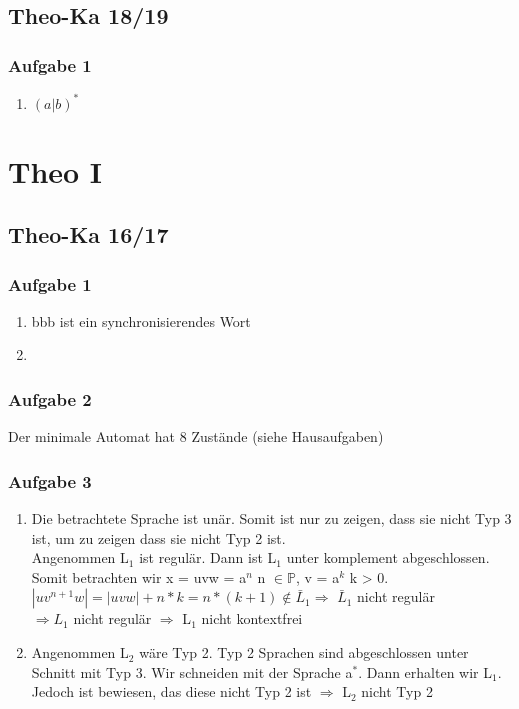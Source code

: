 \documentclass[12pt]{scrartcl}
\begin{document}
\subsection{Theo-Ka 18/19}
	\subsubsection{Aufgabe 1}
	\begin{enumerate}
		\item \( (a|b)^{*}  \)
	\end{enumerate}
	
\section{Theo I}

\subsection{Theo-Ka 16/17}

\subsubsection{Aufgabe 1}
	\begin{enumerate}
		\item bbb ist ein synchronisierendes Wort
		\item 
	\end{enumerate}
	
\subsubsection{Aufgabe 2}
	Der minimale Automat hat 8 Zustände (siehe Hausaufgaben)

\subsubsection{Aufgabe 3}
	\begin{enumerate}
		\item Die betrachtete Sprache ist unär. Somit ist nur zu zeigen, dass sie nicht Typ 3 ist, um zu zeigen dass sie nicht Typ 2 ist.\\
			Angenommen L$_1$ ist regulär. Dann ist L$_1$ unter komplement abgeschlossen. Somit betrachten wir x = uvw = a$^{n}$ n $\in\mathbb{P}$, v = a$^{k}$ k > 0.\\
		\(|uv^{n + 1}w| = |uvw| + n*k = n*(k+1) \notin \bar L_1 \Rightarrow \) $\bar L_1$ nicht regulär \\
		$\Rightarrow L_1$ nicht regulär $\Rightarrow$ L$_1$ nicht kontextfrei
				
		\item  Angenommen L$_2$ wäre Typ 2. Typ 2 Sprachen sind abgeschlossen unter Schnitt mit Typ 3. Wir schneiden mit der Sprache a$^{*}$. Dann erhalten wir L$_1$. Jedoch ist bewiesen, das diese nicht Typ 2 ist $\Rightarrow$ L$_2$ nicht Typ 2
	\end{enumerate}
\end{document}
